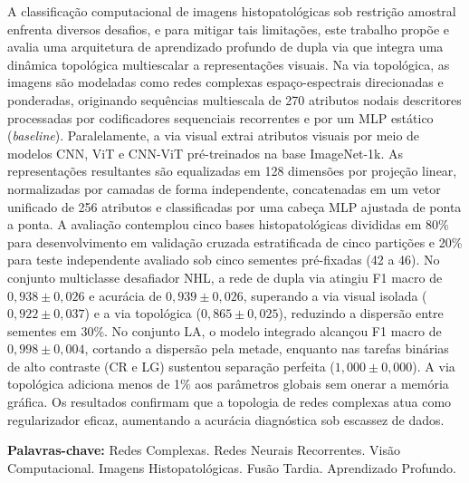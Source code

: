 \documentclass[
  12pt,		
  a4paper,	
  openright,  
  oneside,	
  chapter=TITLE,		
  section=TITLE,		
  english,	
  french,	    
  spanish,	
  brazil	    
]{abntex2}
\begin{document}
    \begin{resumo}
	    A classificação computacional de imagens histopatológicas sob restrição amostral enfrenta diversos desafios, e para mitigar tais limitações, este trabalho propõe e avalia uma arquitetura de aprendizado profundo de dupla via que integra uma dinâmica topológica multiescalar a representações visuais. Na via topológica, as imagens são modeladas como redes complexas espaço-espectrais direcionadas e ponderadas, originando sequências multiescala de 270 atributos nodais descritores processadas por codificadores sequenciais recorrentes e por um MLP estático (\textit{baseline}). Paralelamente, a via visual extrai atributos visuais por meio de modelos CNN, ViT e CNN-ViT pré-treinados na base ImageNet-1k. As representações resultantes são equalizadas em 128 dimensões por projeção linear, normalizadas por camadas de forma independente, concatenadas em um vetor unificado de 256 atributos e classificadas por uma cabeça MLP ajustada de ponta a ponta. A avaliação contemplou cinco bases histopatológicas divididas em 80\% para desenvolvimento em validação cruzada estratificada de cinco partições e 20\% para teste independente avaliado sob cinco sementes pré-fixadas (42 a 46). No conjunto multiclasse desafiador NHL, a rede de dupla via atingiu F1 macro de $0{,}938 \pm 0{,}026$ e acurácia de $0{,}939 \pm 0{,}026$, superando a via visual isolada ($0{,}922 \pm 0{,}037$) e a via topológica ($0{,}865 \pm 0{,}025$), reduzindo a dispersão entre sementes em 30\%. No conjunto LA, o modelo integrado alcançou F1 macro de $0{,}998 \pm 0{,}004$, cortando a dispersão pela metade, enquanto nas tarefas binárias de alto contraste (CR e LG) sustentou separação perfeita ($1{,}000 \pm 0{,}000$). A via topológica adiciona menos de 1\% aos parâmetros globais sem onerar a memória gráfica. Os resultados confirmam que a topologia de redes complexas atua como regularizador eficaz, aumentando a acurácia diagnóstica sob escassez de dados.
        
        \vspace{\onelineskip}
        \noindent\textbf{Palavras-chave:} Redes Complexas. Redes Neurais Recorrentes. Visão Computacional. Imagens Histopatológicas. Fusão Tardia. Aprendizado Profundo.
    \end{resumo}
    
\end{document}
